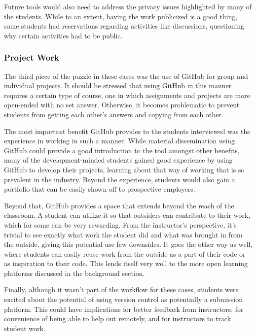 Future tools would also need to address the privacy issues highlighted by many of the students. While to an extent, having the work publicized is a good thing, some students had reservations regarding activities like discussions, questioning why certain activities had to be public. %

\subsubsection{Project Work}
The third piece of the puzzle in these cases was the use of GitHub for group and individual projects. It should be stressed that using GitHub in this manner requires a certain type of course, one in which assignments and projects are more open-ended with no set answer. Otherwise, it becomes problematic to prevent students from getting each other's answers and copying from each other.

The most important benefit GitHub provides to the students interviewed was the experience in working in such a manner. While material dissemination using GitHub could provide a good introduction to the tool amongst other benefits, many of the development-minded students gained good experience by using GitHub to develop their projects, learning about that way of working that is so prevalent in the industry. Beyond the experience, students would also gain a portfolio that can be easily shown off to prospective employers.

Beyond that, GitHub provides a space that extends beyond the reach of the classroom. A student can utilize it so that outsiders can contribute to their work, which for some can be very rewarding. From the instructor's perspective, it's trivial to see exactly what work the student did and what was brought in from the outside, giving this potential use few downsides. It goes the other way as well, where students can easily reuse work from the outside as a part of their code or as inspiration to their code. This lends itself very well to the more open learning platforms discussed in the background section. %

Finally, although it wasn't part of the workflow for these cases, students were excited about the potential of using version control as potentially a submission platform. This could have implications for better feedback from instructors, for convenience of being able to help out remotely, and for instructors to track student work.
